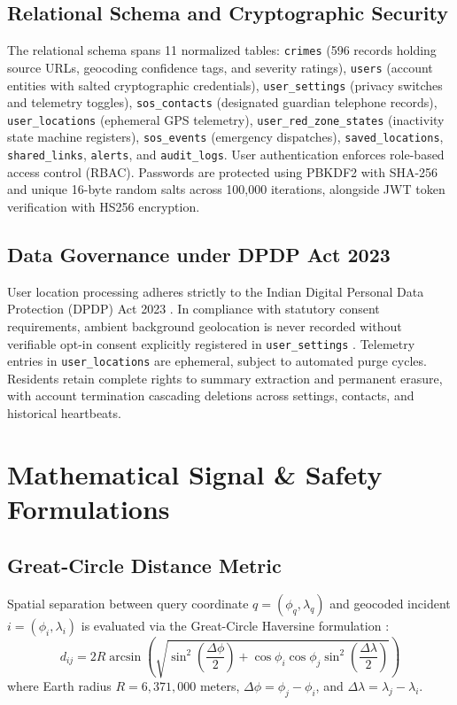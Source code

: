 \documentclass[conference]{IEEEtran}
\begin{document}
\subsection{Relational Schema and Cryptographic Security}
The relational schema spans 11 normalized tables: \texttt{crimes} (596 records holding source URLs, geocoding confidence tags, and severity ratings), \texttt{users} (account entities with salted cryptographic credentials), \texttt{user\_settings} (privacy switches and telemetry toggles), \texttt{sos\_contacts} (designated guardian telephone records), \texttt{user\_locations} (ephemeral GPS telemetry), \texttt{user\_red\_zone\_states} (inactivity state machine registers), \texttt{sos\_events} (emergency dispatches), \texttt{saved\_locations}, \texttt{shared\_links}, \texttt{alerts}, and \texttt{audit\_logs}. User authentication enforces role-based access control (RBAC). Passwords are protected using PBKDF2 with SHA-256 and unique 16-byte random salts across 100,000 iterations, alongside JWT token verification with HS256 encryption.

\subsection{Data Governance under DPDP Act 2023}
User location processing adheres strictly to the Indian Digital Personal Data Protection (DPDP) Act 2023 \cite{dpdp2023}. In compliance with statutory consent requirements, ambient background geolocation is never recorded without verifiable opt-in consent explicitly registered in \texttt{user\_settings} \cite{popescu2016geolocation, beresford2003location}. Telemetry entries in \texttt{user\_locations} are ephemeral, subject to automated purge cycles. Residents retain complete rights to summary extraction and permanent erasure, with account termination cascading deletions across settings, contacts, and historical heartbeats.

\section{Mathematical Signal \& Safety Formulations}
\subsection{Great-Circle Distance Metric}
Spatial separation between query coordinate $q = (\phi_q, \lambda_q)$ and geocoded incident $i = (\phi_i, \lambda_i)$ is evaluated via the Great-Circle Haversine formulation \cite{sinnott1984virtues}:
\begin{equation}
d_{ij} = 2R \arcsin\left(\sqrt{\sin^2\left(\frac{\Delta\phi}{2}\right) + \cos\phi_i \cos\phi_j \sin^2\left(\frac{\Delta\lambda}{2}\right)}\right)
\label{eq:haversine}
\end{equation}
where Earth radius $R = 6,371,000$ meters, $\Delta\phi = \phi_j - \phi_i$, and $\Delta\lambda = \lambda_j - \lambda_i$.
\end{document}
